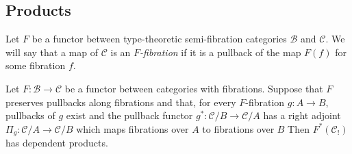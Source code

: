 \documentclass[reqno]{amsart}
\theoremstyle{definition}
\theoremstyle{remark}
\newcommand{\scat}[1]{\mathcal{#1}}
\numberwithin{figure}{section}
\begin{document}
\subsection{Products}

Let $F$ be a functor between type-theoretic semi-fibration categories $\scat{B}$ and $\scat{C}$.
We will say that a map of $\scat{C}$ is an \emph{$F$-fibration} if it is a pullback of the map $F(f)$ for some fibration $f$.

\begin{prop}[products]
Let $F : \scat{B} \to \scat{C}$ be a functor between categories with fibrations.
Suppose that $F$ preserves pullbacks along fibrations and that, for every $F$-fibration $g : A \to B$, pullbacks of $g$ exist and the pullback functor $g^* : \scat{C}/B \to \scat{C}/A$ has a right adjoint $\Pi_g : \scat{C}/A \to \scat{C}/B$ which maps fibrations over $A$ to fibrations over $B$
Then $F^*(\scat{C}_!)$ has dependent products.
\end{prop}
\end{document}
